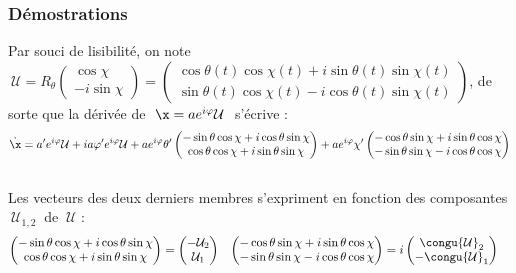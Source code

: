 \begin{annexe}
\begin{itemize}
\end{itemize}


\subsubsection{Démostrations}\label{ann:demo_phases_2var}

\begin{demo}
	Par souci de lisibilité, on note $\ \mathcal{U} = R_{\theta} \begin{pmatrix} \cos\chi \\ -i\sin\chi \end{pmatrix} = \begin{pmatrix} \cos\theta(t) \cos\chi(t) + i\sin\theta(t) \sin\chi(t) \\ \sin\theta(t) \cos\chi(t) - i\cos\theta(t) \sin\chi(t) \end{pmatrix}$, de sorte que la dérivée de $\ \x=ae^{i\varphi}\mathcal{U}\ $ s'écrive :
	\[\dot{\x} = a'e^{i\varphi}\mathcal{U} + ia\varphi'e^{i\varphi} \mathcal{U} + ae^{i\varphi}\theta'\begin{pmatrix} -\sin\theta \cos\chi + i\cos\theta \sin\chi \\ \cos\theta \cos\chi + i\sin\theta \sin\chi \end{pmatrix} + ae^{i\varphi}\chi'\begin{pmatrix} -\cos\theta \sin\chi + i\sin\theta \cos\chi \\ -\sin\theta \sin\chi - i\cos\theta \cos\chi \end{pmatrix}\]
	\\
	Les vecteurs des deux derniers membres s'expriment en fonction des composantes $\ \mathcal{U}_{1,2}\ $ de $\ \mathcal{U}$ :
	\begin{align*}
		\begin{pmatrix} -\sin\theta \cos\chi + i\cos\theta \sin\chi \\ \cos\theta \cos\chi + i\sin\theta \sin\chi \end{pmatrix} &= \begin{pmatrix} -\mathcal{U}_2 \\ \mathcal{U}_1 \end{pmatrix}  &
		\begin{pmatrix} -\cos\theta \sin\chi + i\sin\theta \cos\chi \\ -\sin\theta \sin\chi - i\cos\theta \cos\chi \end{pmatrix} &= i\begin{pmatrix} \congu{\mathcal{U}}_2 \\ -\congu{\mathcal{U}}_1 \end{pmatrix}

\end{align*}
\end{demo}
\end{annexe}
